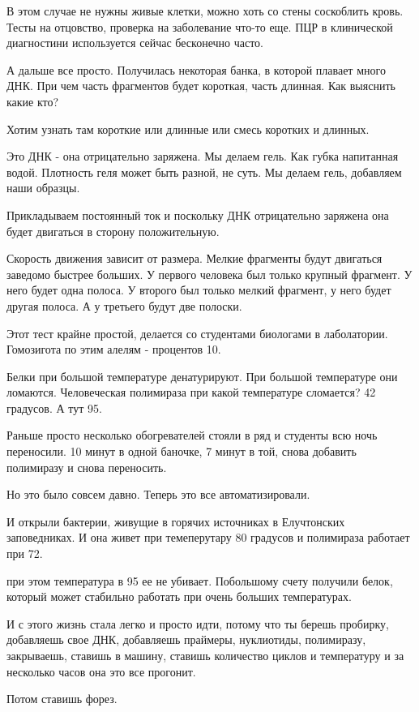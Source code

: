 В этом случае не нужны живые клетки, можно хоть 
со стены соскоблить кровь. Тесты на отцовство, проверка на 
заболевание что-то еще. ПЦР в клинической диагностини 
используется сейчас бесконечно часто. 

А дальше все просто. Получилась некоторая банка, в
которой плавает много ДНК. При чем часть фрагментов будет 
короткая, часть длинная. Как выяснить какие кто?

Хотим узнать там короткие или длинные или смесь коротких 
и длинных. 

Это ДНК - она отрицательно заряжена. Мы делаем гель. Как губка 
напитанная водой. Плотность геля может быть разной, не суть. 
Мы делаем гель, добавляем наши образцы. 

Прикладываем постоянный ток и поскольку ДНК
отрицательно заряжена она будет двигаться в сторону положительную. 

Скорость движения зависит от размера. Мелкие фрагменты будут двигаться 
заведомо быстрее больших. У первого человека был только крупный фрагмент. 
У него будет одна полоса. У второго был только мелкий фрагмент, 
у него будет другая полоса. А у третьего будут две полоски. 

Этот тест крайне простой, делается со студентами биологами в лаболатории. 
Гомозигота по этим алелям - процентов 10. 

Белки при большой температуре  денатурируют. При большой температуре они ломаются. 
Человеческая полимираза при какой температуре сломается? 42 градусов. А тут 
95. 

Раньше просто несколько обогревателей стояли в ряд и студенты всю ночь переносили. 
10 минут в одной баночке, 7 минут в той, снова добавить полимиразу и снова переносить. 

Но это было совсем давно. Теперь это все автоматизировали. 

И открыли бактерии, живущие в горячих источниках в 
Елучтонских заповедниках. И она живет при темеперутару 80 градусов и 
полимираза работает при 72. 

при этом температура в 95 ее не убивает. Побольшому счету получили белок, 
который может стабильно работать при очень больших температурах. 

И с этого жизнь стала легко и просто идти, потому что ты берешь пробирку, 
добавляешь свое ДНК, добавляешь праймеры, нуклиотиды, полимиразу, 
закрываешь, ставишь в машину, ставишь количество циклов и температуру и 
за несколько часов она это все прогонит. 

Потом ставишь форез. 

